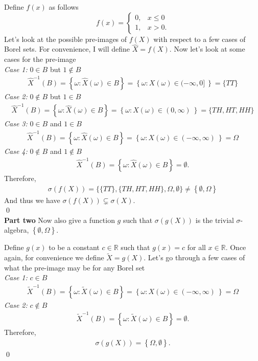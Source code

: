 \documentclass[10pt]{amsart}
\begin{document}
\noindent
Define $f(x)$ as follows
$$
f(x)= \begin{cases}
 	0, & x \leq 0 \\
	1, & x > 0.
\end{cases}
$$
Let's look at the possible pre-images of $f(X)$ with respect to a few cases of Borel sets.
For convenience, I will define $\hat X = f(X)$.
Now let's look at some cases for the pre-image\\
\textit{Case 1:} $0 \in B$ but $1 \not\in B$
\begin{align*}
\hat X^{-1} (B) = \left\{ \omega : \hat X(\omega) \in B \right\} = \left\{ \omega : X(\omega) \in (-\infty, 0] \ \right\} = \{ TT \}
\end{align*}
\textit{Case 2:} $0 \not \in B$ but $1 \in B$
\begin{align*}
\hat X^{-1} (B) = \left\{ \omega : \hat X(\omega) \in B \right\} = \left\{ \omega : X(\omega) \in (0, \infty) \ \right\} = \{ TH, HT, HH \}
\end{align*}
\textit{Case 3:} $0 \in B$ and $1 \in B$
\begin{align*}
\hat X^{-1} (B) = \left\{ \omega : \hat X(\omega) \in B \right\} = \left\{ \omega : X(\omega) \in (-\infty, \infty) \ \right\} = \Omega
\end{align*}
\textit{Case 4:} $0 \not\in B$ and $1 \not\in B$
\begin{align*}
\hat X^{-1} (B) = \left\{ \omega : \hat X(\omega) \in B \right\} = \emptyset.
\end{align*}
Therefore,
\begin{align*}
\sigma(f(X)) = \bigg\{
	\{ TT \},
	\{ TH, HT, HH \},
	\Omega,
	\emptyset
\bigg\} \neq \left\{\emptyset, \Omega \right\}
\end{align*}
And thus we have $\sigma(f(X)) \subsetneq \sigma(X)$. \\
\qed \\
\textbf{Part two}
Now also give a function $g$ such that $\sigma(g(X))$ is the trivial $\sigma$-algebra, $\left\{ \emptyset, \Omega\right\}$.

\noindent
Define $g(x)$ to be a constant $c \in \mathbb R$ such that $g(x) = c$ for all $x \in \mathbb R$.
Once again, for convenience we define $\tilde X = g(X)$.
Let's go through a few cases of what the pre-image may be for any Borel set\\
\textit{Case 1:} $c \in B$
\begin{align*}
\tilde X^{-1} (B) = \left\{ \omega : \tilde X(\omega) \in B \right\} = \left\{ \omega : X(\omega) \in (-\infty, \infty) \ \right\} = \Omega
\end{align*}
\textit{Case 2:} $c \not \in B$
\begin{align*}
\tilde X^{-1} (B) = \left\{ \omega : \tilde X(\omega) \in B \right\} = \emptyset.
\end{align*}
Therefore,
\begin{align*}
\sigma(g(X)) = \left\{ \Omega, \emptyset \right\}.
\end{align*}
\qed
\\
\end{document}
